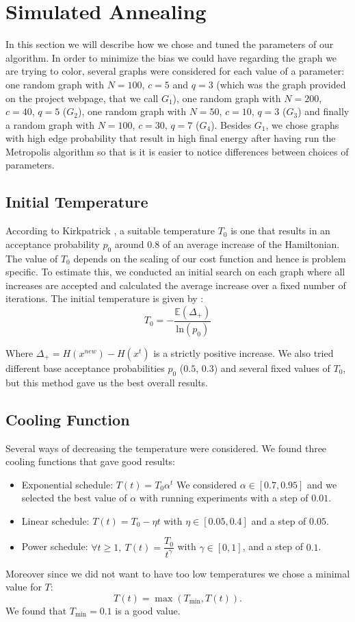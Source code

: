 \documentclass[a4paper]{article}
\begin{document}
\section{Simulated Annealing}
In this section we will describe how we chose and tuned the parameters of our algorithm. In order to minimize the bias we could have regarding the graph we are trying to color, several graphs were considered for each value of a parameter: one random graph with $N=100$, $c=5$ and $q=3$ (which was the graph provided on the project webpage, that we call $G_1$), one random graph with $N=200$, $c=40$, $q=5$ ($G_2$), one random graph with $N=50$, $c=10$, $q=3$ ($G_3$) and finally a random graph with $N=100$, $c=30$, $q=7$ ($G_4$). Besides $G_1$, we chose graphs with high edge probability that result in high final energy after having run the Metropolis algorithm so that is it is easier to notice differences between choices of parameters.

\subsection{Initial Temperature}
According to Kirkpatrick \cite{kirkpatrick}, a suitable temperature $T_0$ is one that results in an acceptance probability $p_0$ around $0.8$ of an average increase of the Hamiltonian. The value of $T_0$ depends on the scaling of our cost function and hence is problem specific. To estimate this, we conducted an initial search on each graph where all increases are accepted and calculated the average increase over a fixed number of iterations. The initial temperature is given by :
$$T_0=-\dfrac{\mathbb{E}(\Delta_+)}{\mathrm{ln}(p_0)}$$

Where $\Delta_+ = H(x^{new}) - H(x^t)$ is a strictly positive increase. We also tried different base acceptance probabilities $p_0$ ($0.5$, $0.3$) and several fixed values of $T_0$, but this method gave us the best overall results.

\subsection{Cooling Function}
Several ways of decreasing the temperature were considered. We found three cooling functions that gave good results:
\begin{itemize}
\item Exponential schedule: $T(t)=T_0 \alpha^t$
We considered $\alpha \in [0.7,0.95]$ and we selected the best value of $\alpha$ with running experiments with a step of $0.01$.
\item Linear schedule: $T(t)=T_0 -\eta t$ with $\eta \in [0.05,0.4]$ and a step of $0.05$.
\item Power schedule: $\forall t \geqslant 1, \ T(t)=\dfrac{T_0}{t^{\gamma}}$ with $\gamma \in [0,1]$, and a step of $0.1$.
\end{itemize}
Moreover since we did not want to have too low temperatures we chose a minimal value for $T$: $$T(t)=\max(T_{\min},T(t)).$$ We found that $T_{\min}=0.1$ is a good value. 
\\
\end{document}
